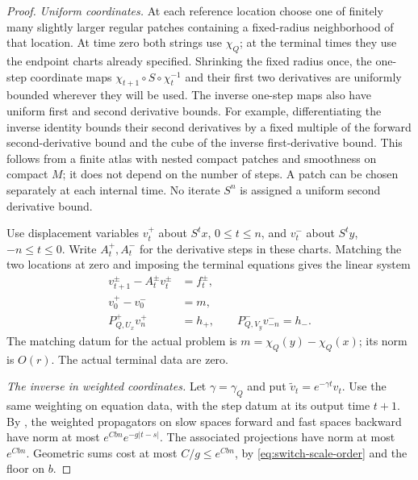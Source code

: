 \begin{proof}
\emph{Uniform coordinates.}
At each reference location choose one of finitely many slightly larger
regular patches containing a fixed-radius neighborhood of that location.
At time zero both strings use $\chi_Q$; at the terminal times they use
the endpoint charts already specified.  Shrinking the fixed radius once,
the one-step coordinate maps
$\chi_{t+1}\circ S\circ\chi_t^{-1}$ and their first two derivatives
are uniformly bounded wherever they will be used.  The inverse
one-step maps also have uniform first and second derivative bounds.
For example, differentiating the inverse identity bounds their second
derivatives by a fixed multiple of the forward second-derivative bound
and the cube of the inverse first-derivative bound.  This
follows from a finite atlas with nested compact patches and smoothness
on compact $M$; it does not depend on the number of steps.  A patch
can be chosen separately at each internal time.  No iterate $S^n$
is assigned a uniform second derivative bound.

Use displacement variables $v_t^+$ about $S^tx$, $0\le t\le n$,
and $v_t^-$ about $S^ty$, $-n\le t\le0$.  Write $A_t^+,A_t^-$
for the derivative steps in these charts.  Matching the two locations
at zero and imposing the terminal equations gives the linear system
\begin{equation}\label{eq:linear-boundary-system}
 \begin{aligned}
 v_{t+1}^{\pm}-A_t^{\pm}v_t^{\pm}&=f_t^{\pm},\\
 v_0^+-v_0^-&=m,\\
 P^+_{Q,U_x}v_n^+&=h_+,\qquad
 P^-_{Q,V_y}v_{-n}^-=h_-.
 \end{aligned}
\end{equation}
The matching datum for the actual problem is
$m=\chi_Q(y)-\chi_Q(x)$; its norm is $O(r)$.
The actual terminal data are zero.

\emph{The inverse in weighted coordinates.}
Let $\gamma=\gamma_Q$ and put $\widetilde v_t=e^{-\gamma t}v_t$.
Use the same weighting on equation data, with the step datum at its
output time $t+1$.  By , the weighted
propagators on slow spaces forward and fast spaces backward have norm
at most $e^{Cbn}e^{-g|t-s|}$.  The associated projections have norm
at most $e^{Cbn}$.  Geometric sums cost at most
$C/g\le e^{Cbn}$, by \eqref{eq:switch-scale-order} and the floor on $b$.


\end{proof}
